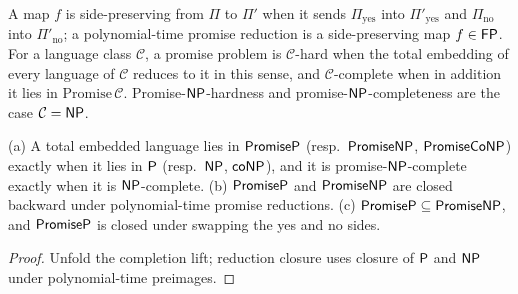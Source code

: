 \begin{definition}
  \label{def:meta-promise-reduction}
  \leanok
  A map $f$ is side-preserving from $\Pi$ to $\Pi'$ when it sends
  $\Pi_{\mathrm{yes}}$ into $\Pi'_{\mathrm{yes}}$ and $\Pi_{\mathrm{no}}$ into
  $\Pi'_{\mathrm{no}}$; a polynomial-time promise reduction is a
  side-preserving map $f \in \mathsf{FP}$. For a language class $\mathcal{C}$, a
  promise problem is $\mathcal{C}$-hard when the total embedding of every
  language of $\mathcal{C}$ reduces to it in this sense, and
  $\mathcal{C}$-complete when in addition it lies in
  $\mathrm{Promise}\,\mathcal{C}$. Promise-$\mathsf{NP}$-hardness and
  promise-$\mathsf{NP}$-completeness are the case $\mathcal{C} = \mathsf{NP}$.
\end{definition}

\begin{theorem}
  \label{thm:meta-promise-basics}
  \leanok
  (a) A total embedded language lies in $\mathsf{PromiseP}$ (resp.\
  $\mathsf{PromiseNP}$, $\mathsf{PromiseCoNP}$) exactly when it lies in $\mathsf{P}$
  (resp.\ $\mathsf{NP}$, $\mathsf{coNP}$), and it is promise-$\mathsf{NP}$-complete
  exactly when it is $\mathsf{NP}$-complete.
  (b) $\mathsf{PromiseP}$ and $\mathsf{PromiseNP}$ are closed backward under
  polynomial-time promise reductions. (c) $\mathsf{PromiseP} \subseteq
  \mathsf{PromiseNP}$, and $\mathsf{PromiseP}$ is closed under swapping the yes and no
  sides.
\end{theorem}
\begin{proof}
  \leanok
  Unfold the completion lift; reduction closure uses closure of $\mathsf{P}$ and
  $\mathsf{NP}$ under polynomial-time preimages.
\end{proof}

